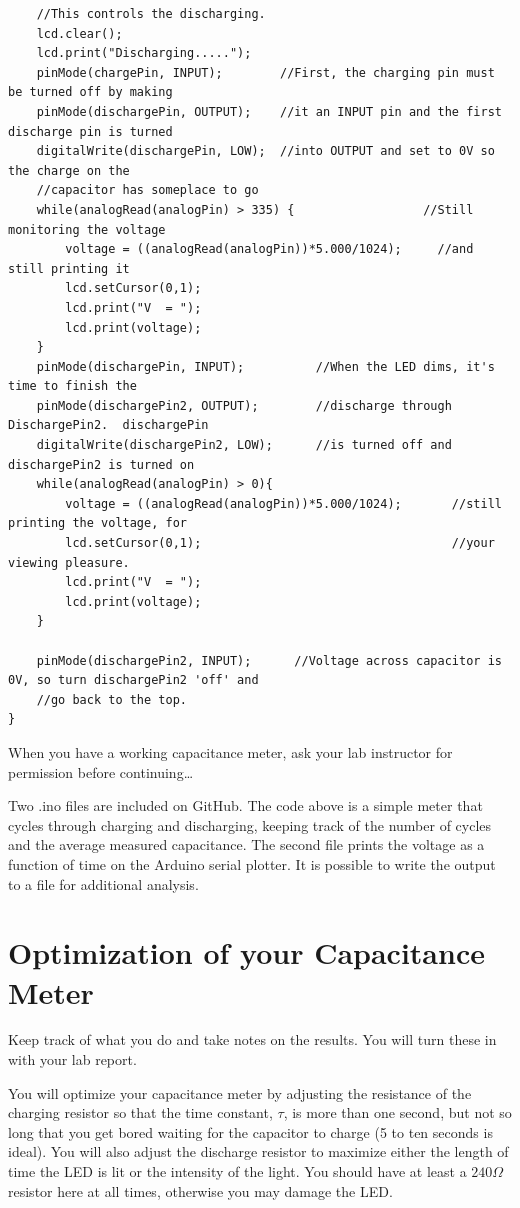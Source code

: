 \documentclass[]{article}
\begin{document}
\begin{verbatim}
	//This controls the discharging.  
	lcd.clear(); 
	lcd.print("Discharging.....");
	pinMode(chargePin, INPUT);        //First, the charging pin must be turned off by making 
	pinMode(dischargePin, OUTPUT);    //it an INPUT pin and the first discharge pin is turned 
	digitalWrite(dischargePin, LOW);  //into OUTPUT and set to 0V so the charge on the 
	//capacitor has someplace to go
	while(analogRead(analogPin) > 335) {                  //Still monitoring the voltage
		voltage = ((analogRead(analogPin))*5.000/1024);     //and still printing it    
		lcd.setCursor(0,1);
		lcd.print("V  = ");
		lcd.print(voltage);
	}
	pinMode(dischargePin, INPUT);          //When the LED dims, it's time to finish the 
	pinMode(dischargePin2, OUTPUT);        //discharge through DischargePin2.  dischargePin 
	digitalWrite(dischargePin2, LOW);      //is turned off and dischargePin2 is turned on 
	while(analogRead(analogPin) > 0){      
		voltage = ((analogRead(analogPin))*5.000/1024);       //still printing the voltage, for    
		lcd.setCursor(0,1);                                   //your viewing pleasure.
		lcd.print("V  = ");
		lcd.print(voltage);
	}
	
	pinMode(dischargePin2, INPUT);      //Voltage across capacitor is 0V, so turn dischargePin2 'off' and 
	//go back to the top.
}
\end{verbatim}

When you have a working capacitance meter, ask your lab instructor for permission before continuing\dots 

Two .ino files are included on GitHub. The code above is a simple meter that cycles through charging and discharging, keeping track of the number of cycles and the average measured capacitance.  The second file prints the voltage as a function of time on the Arduino serial plotter.  It is possible to write the output to a file for additional analysis.

\section{Optimization of your Capacitance Meter}

Keep track of what you do and take notes on the results.  You will turn these in with your lab report.

You will  optimize your capacitance meter by adjusting the resistance of the charging resistor so that the time constant, $\tau$, is more than one second, but not so long that you get bored waiting for the capacitor  to charge (5 to ten seconds is ideal).  You will also adjust the discharge resistor to maximize either the length of time the LED is lit or the intensity of the light.  You should have at least a $240 \Omega$ resistor here at all times, otherwise you may damage the LED.
\end{document}
